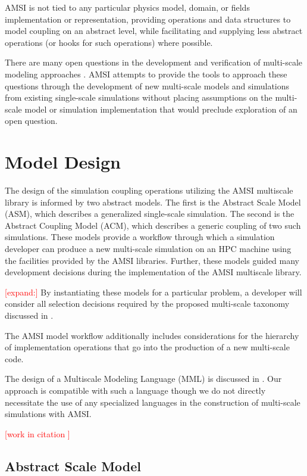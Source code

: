 \documentclass[review]{siamart1116}
\newcommand{\red}[1]{\textcolor{red}{[#1]}}
\begin{document}
AMSI is not tied to any particular physics model, domain, or fields implementation or representation, providing operations and data structures to model coupling on an abstract level, while facilitating and supplying less abstract operations (or hooks for such operations) where possible.

There are many open questions in the development and verification of multi-scale modeling approaches \cite{hoekstra2014multiscale}. AMSI attempts to provide the tools to approach these questions through the development of new multi-scale models and simulations from existing single-scale simulations without placing assumptions on the multi-scale model or simulation implementation that would preclude exploration of an open question.

\section{Model Design}\label{sec:model-design}

The design of the simulation coupling operations utilizing the AMSI multiscale library is informed by two abstract models. The first is the Abstract Scale Model (ASM), which describes a generalized single-scale simulation. The second is the Abstract Coupling Model (ACM), which describes a generic coupling of two such simulations. These models provide a workflow through which a simulation developer can produce a new multi-scale simulation on an HPC machine using the facilities provided by the AMSI libraries. Further, these models guided many development decisions during the implementation of the AMSI multiscale library.

\red{expand:}
By instantiating these models for a particular problem, a developer will consider all selection decisions required by the proposed multi-scale taxonomy discussed in \cite{gravemeier2008towards}.

 The AMSI model workflow additionally includes considerations for the hierarchy of implementation operations that go into the production of a new multi-scale code.

The design of a Multiscale Modeling Language (MML) is discussed in \cite{hoekstra2007toward}. Our approach is compatible with such a language though we do not directly necessitate the use of any specialized languages in the construction of multi-scale simulations with AMSI. 

\red{work in citation \cite{ingram2004classification}}

\subsection{Abstract Scale Model}\label{sec:scale-model}
\end{document}

